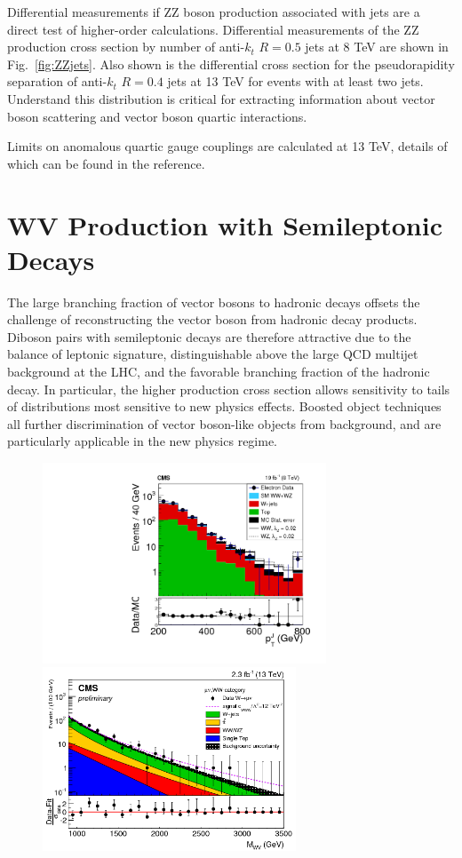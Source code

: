 \documentclass[10pt]{article}
\begin{document}
Differential measurements if ZZ boson production associated with jets are
a direct test of higher-order calculations. Differential measurements of 
the ZZ production cross section by number of anti-$k_{t}$ $R=0.5$ jets 
at 8 TeV are shown in Fig.~\ref{fig:ZZjets}. Also shown is the differential
cross section for the pseudorapidity separation of
anti-$k_{t}$ $R=0.4$ jets at 13 TeV for events with at least two jets.
Understand this distribution is critical for extracting information
about vector boson scattering and vector boson quartic interactions.

Limits on anomalous quartic gauge couplings are calculated at 13 TeV, 
details of which can be found in the reference.

\section{WV Production with Semileptonic Decays}

The large branching fraction 
of vector bosons to hadronic decays offsets
the challenge of reconstructing the vector boson from
hadronic decay products. Diboson pairs with semileptonic decays
are therefore attractive due to the balance of leptonic signature, 
distinguishable above the large QCD multijet background at the LHC,
and the favorable branching fraction of the hadronic decay.
In particular, the higher production cross section
allows sensitivity to tails of distributions most sensitive to new physics
effects. Boosted object techniques all further discrimination of
vector boson-like objects from background, and are particularly applicable
in the new physics regime.

\begin{figure}[htb]
  \centering
    \includegraphics[height=2.35in]{figures/WV8TeV_ptJ_aC.png}
    \includegraphics[height=2.15in]{figures/WV13TeV_mWW_aC.png}
  \caption{ }
  \label{fig:WV}
\end{figure}
\end{document}
